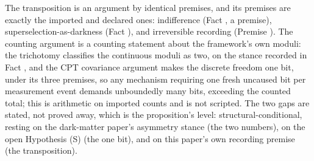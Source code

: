 The transposition is an argument by identical premises, and its premises are exactly the imported and declared ones: indifference (Fact , a premise), superselection-as-darkness (Fact ), and irreversible recording (Premise ). The counting argument is a counting statement about the framework's own moduli: the trichotomy classifies the continuous moduli as two, on the stance recorded in Fact , and the CPT covariance argument makes the discrete freedom one bit, under its three premises, so any mechanism requiring one fresh uncaused bit per measurement event demands unboundedly many bits, exceeding the counted total; this is arithmetic on imported counts and is not scripted. The two gaps are stated, not proved away, which is the proposition's level: structural-conditional, resting on the dark-matter paper's asymmetry stance (the two numbers), on the open Hypothesis (S) (the one bit), and on this paper's own recording premise (the transposition).
